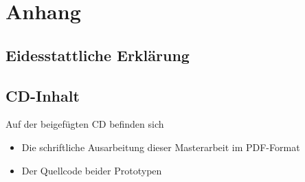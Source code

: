 \documentclass[
	a4paper,
	oneside,
	11pt,
	headsepline, %
]{scrreprt} %
\begin{document}
\nocite{*}
\pagestyle{empty}



\renewcommand{\contentsname}{Inhalt}
\tableofcontents
\cleardoublepage
\pagestyle{headings}
%









%
%

\printglossary[type=\acronymtype, title=Abkürzungen, style=super]
\printglossary[type=main,style=altlist]
%
%
\clearpage
{}
\listoffigures
%
%
\renewcommand\lstlistlistingname{Quellcodeverzeichnis}
\lstlistoflistings
%
%


%
%
\clearpage
\appendix
{}
\chapter*{Anhang}
\section*{Eidesstattliche Erklärung}
\section*{CD-Inhalt}
Auf der beigefügten CD befinden sich
\begin{itemize}
	\item Die schriftliche Ausarbeitung dieser Masterarbeit im PDF-Format
	\item Der Quellcode beider Prototypen
\end{itemize}
%
\end{document}
